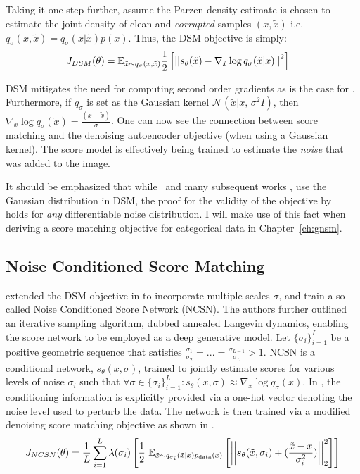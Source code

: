 Taking it one step further, assume the Parzen density estimate is chosen to estimate the joint density of clean and \textit{corrupted} samples $(x, \tilde{x})$ i.e. $q_{\sigma}(x, \tilde{x}) = q_{\sigma}(x | \tilde{x} ) p(x) $. Thus, the DSM objective is simply:
\begin{align}
\label{eq:denoising_sm}
    J_{DSM}(\theta) &= \mathbb{E}_{\tilde{x}\sim q_{\sigma}(x, \tilde{x})} \frac{1}{2} \left[ { \left|\left| {s_\theta(\tilde{x}) - \nabla_{\tilde{x}} \log q_{\sigma}(\tilde{x} | x ) } \right|\right|^2 } \right]
\end{align}

DSM mitigates the need for computing second order gradients as is the case for . Furthermore, if $q_{\sigma}$ is set as the Gaussian kernel $\mathcal{N}(\tilde{x} |  x,\,\sigma^{2}I)$, then $\nabla_x \log q_{\sigma}(\tilde{x}) = \frac{(x - \tilde{x})}{\sigma}$. One can now see the connection between score matching and the denoising autoencoder objective (when using a Gaussian kernel). The score model is effectively being trained to estimate the \textit{noise} that was added to the image.

It should be emphasized that while~\cite{vincent2011connection} and many subsequent works \cite{Song2019,song2020improved,song2020score}, use the Gaussian distribution in DSM, the proof for the validity of the objective by~\cite{vincent2011connection} holds for \textit{any} differentiable noise distribution.
I will make use of this fact when deriving a score matching objective for categorical data in Chapter~\ref{ch:gnsm}.

\subsection*{Noise Conditioned Score Matching}
\label{NCSM}

\cite{Song2019} extended the DSM objective in  to incorporate multiple scales $\sigma$, and train a so-called Noise Conditioned Score Network (NCSN). The authors further outlined an iterative sampling algorithm, dubbed annealed Langevin dynamics, enabling the score network to be employed as a deep generative model. Let $\{\sigma_i\}_{i=1}^L$ be a positive geometric sequence that satisfies $\frac{\sigma_1}{\sigma_2} = ... = \frac{\sigma_{L-1}}{\sigma_{L}} >  1$. NCSN is a conditional network, $s_{\theta}(x,\sigma)$, trained to jointly estimate scores for various levels of noise $\sigma_i$ such that $\forall \sigma \in \{\sigma_i\}_{i=1}^L: s_{\theta}(x,\sigma) \approx \nabla_x \log q_{\sigma}(x)$. In \cite{Song2019}, the conditioning information is explicitly provided via a one-hot vector denoting the noise level used to perturb the data. The network is then trained via a modified denoising score matching objective as shown in .
\begin{equation}
\label{eq:ncsn_dsm}
J_{NCSN}(\theta) = \frac{1}{L} \sum_{i=1}^L \lambda(\sigma_i)
\left[ {\frac{1}{2} \displaystyle \text{~} \mathbb{E}_{\tilde{x}\sim q_{\sigma_i} (\tilde{x}|x) p_{\text{data}}(x)} \left[ { \left|\left| { s_{\theta}(\tilde{x}, \sigma_i) + (\frac{\tilde{x} - x}{\sigma_i^2}) } \right|\right|^2_2  } \right] } \right]
\end{equation}

